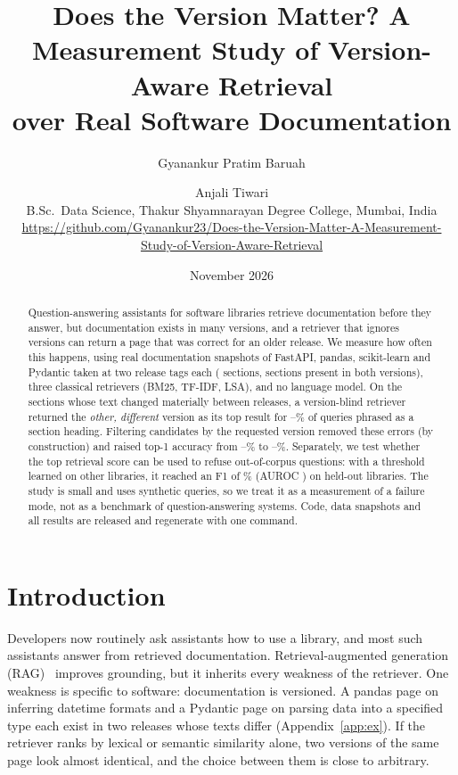 \documentclass[11pt,a4paper]{article}
\title{Does the Version Matter? A Measurement Study of Version-Aware Retrieval\\ over Real Software Documentation}
\author{Gyanankur Pratim Baruah \and Anjali Tiwari\\[2pt]
\small B.Sc.\ Data Science, Thakur Shyamnarayan Degree College, Mumbai, India\\
\small \url{https://github.com/Gyanankur23/Does-the-Version-Matter-A-Measurement-Study-of-Version-Aware-Retrieval}}
\date{November 2026}
\begin{document}
\maketitle

\begin{abstract}
Question-answering assistants for software libraries retrieve documentation before they answer, but
documentation exists in many versions, and a retriever that ignores versions can return a page that was
correct for an older release. We measure how often this happens, using real documentation snapshots of
FastAPI, pandas, scikit-learn and Pydantic taken at two release tags each (\NSections{} sections, \NPairs{}
sections present in both versions), three classical retrievers (BM25, TF-IDF, LSA), and no language model.
On the \NChanged{} sections whose text changed materially between releases, a version-blind retriever returned the
\emph{other, different} version as its top result for \StaleHMin--\StaleHMax\% of queries phrased as a section
heading. Filtering candidates by the requested version removed these errors (by construction) and raised top-1
accuracy from \HitBlindHMin--\HitBlindHMax\% to \HitAwareHMin--\HitAwareHMax\%. Separately, we test whether the
top retrieval score can be used to refuse out-of-corpus questions: with a threshold learned on other libraries, it
reached an F1 of \CFscore\% (AUROC \CauROC) on held-out libraries. The study is small and uses synthetic queries, so we
treat it as a measurement of a failure mode, not as a benchmark of question-answering systems. Code, data
snapshots and all results are released and regenerate with one command.
\end{abstract}

\section{Introduction}
Developers now routinely ask assistants how to use a library, and most such assistants answer from retrieved
documentation. Retrieval-augmented generation (RAG)~\cite{lewis2020rag} improves grounding, but it inherits every
weakness of the retriever. One weakness is specific to software: documentation is versioned. A pandas page on inferring datetime formats and a Pydantic page on parsing data into a specified type
each exist in two releases whose texts differ (Appendix~\ref{app:ex}). If the retriever ranks by lexical or semantic similarity alone, two
versions of the same page look almost identical, and the choice between them is close to arbitrary.
\end{document}
